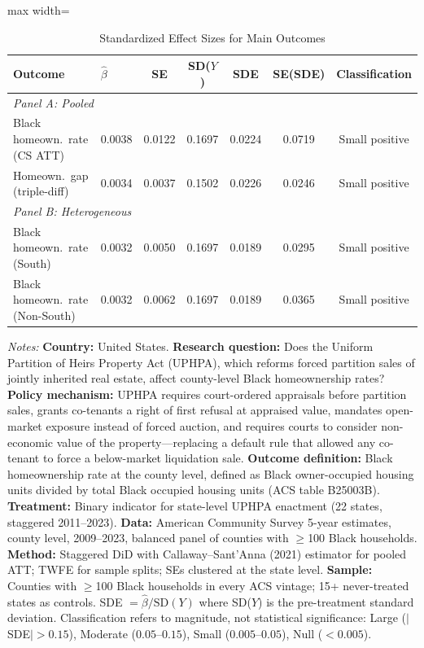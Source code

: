 
\begin{table}[H]
\centering
\caption{Standardized Effect Sizes for Main Outcomes}
\label{tab:sde}
\begin{adjustbox}{max width=\textwidth}
\begin{tabular}{llccccc}
\toprule
Outcome & $\hat{\beta}$ & SE & SD($Y$) & SDE & SE(SDE) & Classification \\
\midrule
\multicolumn{7}{l}{\textit{Panel A: Pooled}} \\
Black homeown.\ rate (CS ATT) & 0.0038 & 0.0122 & 0.1697 & 0.0224 & 0.0719 & Small positive \\
Homeown.\ gap (triple-diff) & 0.0034 & 0.0037 & 0.1502 & 0.0226 & 0.0246 & Small positive \\
\midrule
\multicolumn{7}{l}{\textit{Panel B: Heterogeneous}} \\
Black homeown.\ rate (South) & 0.0032 & 0.0050 & 0.1697 & 0.0189 & 0.0295 & Small positive \\
Black homeown.\ rate (Non-South) & 0.0032 & 0.0062 & 0.1697 & 0.0189 & 0.0365 & Small positive \\
\bottomrule
\end{tabular}
\end{adjustbox}
\par\vspace{0.3em}
{\footnotesize \textit{Notes:}
\textbf{Country:} United States.
\textbf{Research question:} Does the Uniform Partition of Heirs Property Act (UPHPA), which reforms forced partition sales of jointly inherited real estate, affect county-level Black homeownership rates?
\textbf{Policy mechanism:} UPHPA requires court-ordered appraisals before partition sales, grants co-tenants a right of first refusal at appraised value, mandates open-market exposure instead of forced auction, and requires courts to consider non-economic value of the property---replacing a default rule that allowed any co-tenant to force a below-market liquidation sale.
\textbf{Outcome definition:} Black homeownership rate at the county level, defined as Black owner-occupied housing units divided by total Black occupied housing units (ACS table B25003B).
\textbf{Treatment:} Binary indicator for state-level UPHPA enactment (22 states, staggered 2011--2023).
\textbf{Data:} American Community Survey 5-year estimates, county level, 2009--2023, balanced panel of counties with $\geq$100 Black households.
\textbf{Method:} Staggered DiD with Callaway--Sant'Anna (2021) estimator for pooled ATT; TWFE for sample splits; SEs clustered at the state level.
\textbf{Sample:} Counties with $\geq$100 Black households in every ACS vintage; 15+ never-treated states as controls.
SDE $= \hat{\beta} / \text{SD}(Y)$ where SD($Y$) is the pre-treatment standard deviation.
Classification refers to magnitude, not statistical significance:
Large ($|$SDE$| > 0.15$), Moderate ($0.05$--$0.15$), Small ($0.005$--$0.05$), Null ($< 0.005$).}
\end{table}

